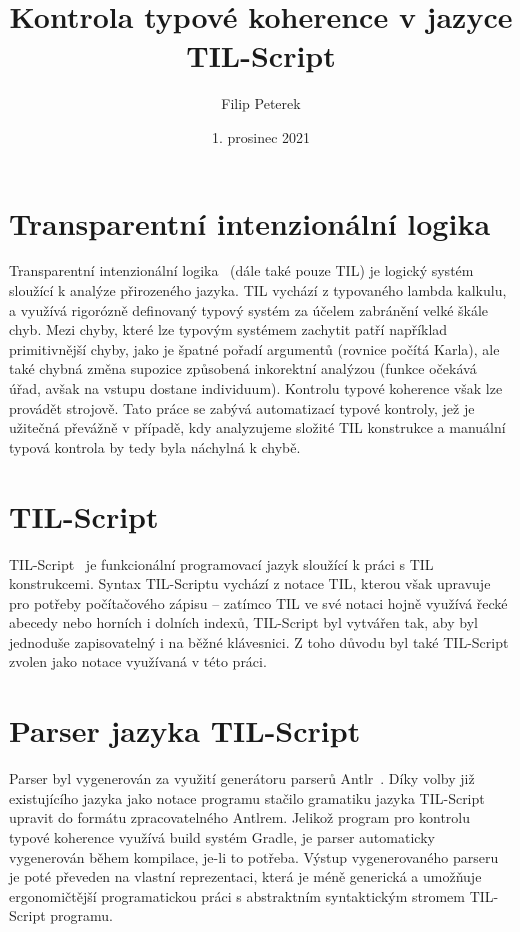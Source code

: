 \documentclass{article}
\title{Kontrola typové koherence v jazyce TIL-Script}
\author{Filip Peterek}
\date{1. prosinec 2021}
\begin{document}
\maketitle

\section{Transparentní intenzionální logika}

Transparentní intenzionální logika~\cite{til-duzi} (dále také pouze TIL) je logický systém sloužící
k analýze přirozeného jazyka. TIL vychází z typovaného lambda kalkulu, a využívá rigorózně definovaný
typový systém za účelem zabránění velké škále chyb. Mezi chyby, které lze typovým systémem zachytit
patří například primitivnější chyby, jako je špatné pořadí argumentů (rovnice počítá Karla), ale také
chybná změna supozice způsobená inkorektní analýzou (funkce očekává úřad, avšak na vstupu dostane
individuum). Kontrolu typové koherence však lze provádět strojově. Tato práce se zabývá automatizací
typové kontroly, jež je užitečná převážně v případě, kdy analyzujeme složité TIL konstrukce a manuální
typová kontrola by tedy byla náchylná k chybě.

\section{TIL-Script}

TIL-Script~\cite{til-script} je funkcionální programovací jazyk sloužící k práci s TIL konstrukcemi.
Syntax TIL-Scriptu vychází z notace TIL, kterou však upravuje pro potřeby počítačového zápisu -- zatímco
TIL ve své notaci hojně využívá řecké abecedy nebo horních i dolních indexů, TIL-Script byl vytvářen
tak, aby byl jednoduše zapisovatelný i na běžné klávesnici. Z toho důvodu byl také TIL-Script zvolen
jako notace využívaná v této práci.

\section{Parser jazyka TIL-Script}

Parser byl vygenerován za využití generátoru parserů Antlr~\cite{antlr-src}. Díky volby již existujícího
jazyka jako notace programu stačilo gramatiku jazyka TIL-Script upravit do formátu zpracovatelného
Antlrem. Jelikož program pro kontrolu typové koherence využívá build systém Gradle, je parser automaticky
vygenerován během kompilace, je-li to potřeba. Výstup vygenerovaného parseru je poté převeden na vlastní
reprezentaci, která je méně generická a umožňuje ergonomičtější programatickou práci s abstraktním
syntaktickým stromem TIL-Script programu.
\end{document}
